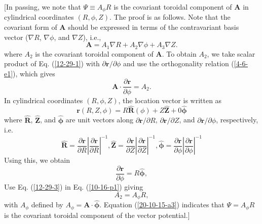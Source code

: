 \documentclass{llncs}
\newcommand{\tmmathbf}[1]{\ensuremath{\boldsymbol{#1}}}
\begin{document}
[In passing, we note that $\Psi \equiv A_{\phi} R$ is the covariant toroidal
component of $\mathbf{A}$ in cylindrical coordinates $(R, \phi, Z)$. The proof
is as follows. Note that the covariant form of $\mathbf{A}$ should be
expressed in terms of the contravariant basis vector ($\nabla R$, $\nabla
\phi$, and $\nabla Z$), i.e.,
\begin{equation}
  \label{12-29-1} \mathbf{A}= A_1 \nabla R + A_2 \nabla \phi + A_3 \nabla Z.
\end{equation}
where $A_2$ is the covariant toroidal component of $\mathbf{A}$. To obtain
$A_2$, we take scalar product of Eq. (\ref{12-29-1}) with $\partial
\mathbf{r}/ \partial \phi$ and use the orthogonality relation (\ref{4-6-e1}),
which gives
\begin{equation}
  \label{10-16-p1} \mathbf{A} \cdot \frac{\partial \mathbf{r}}{\partial \phi}
  = A_2 .
\end{equation}
In cylindrical coordinates $(R, \phi, Z)$, the location vector is written as
\begin{equation}
  \mathbf{r} (R, Z, \phi) = R \hat{\mathbf{R}} (\phi) + Z \hat{\mathbf{Z}} + 0
  \hat{\tmmathbf{\phi}}
\end{equation}
where $\hat{\mathbf{R}}$, $\hat{\mathbf{Z}}$, and $\hat{\tmmathbf{\phi}}$ are
unit vectors along $\partial \mathbf{r}/ \partial R$, $\partial \mathbf{r}/
\partial Z$, and $\partial \mathbf{r}/ \partial \phi$, respectively, i.e.
\begin{equation}
  \hat{\mathbf{R}} = \frac{\partial \mathbf{r}}{\partial R} \left|
  \frac{\partial \mathbf{r}}{\partial R} \right|^{- 1}, \hat{\mathbf{Z}} =
  \frac{\partial \mathbf{r}}{\partial Z} \left| \frac{\partial
  \mathbf{r}}{\partial Z} \right|^{- 1}, \hat{\tmmathbf{\phi}} =
  \frac{\partial \mathbf{r}}{\partial \phi} \left| \frac{\partial
  \mathbf{r}}{\partial \phi} \right|^{- 1}
\end{equation}
Using this, we obtain
\begin{equation}
  \label{12-29-3} \frac{\partial \mathbf{r}}{\partial \phi} = R
  \hat{\tmmathbf{\phi}},
\end{equation}
Use Eq. (\ref{12-29-3}) in Eq. (\ref{10-16-p1}) giving
\begin{equation}
  \label{20-10-15-a3} A_2 = A_{\phi} R,
\end{equation}
with $A_{\phi}$ defined by $A_{\phi} =\mathbf{A} \cdot \hat{\tmmathbf{\phi}}$.
Equation (\ref{20-10-15-a3}) indicates that $\Psi = A_{\phi} R$ is the
covariant toroidal component of the vector potential.]
\end{document}
